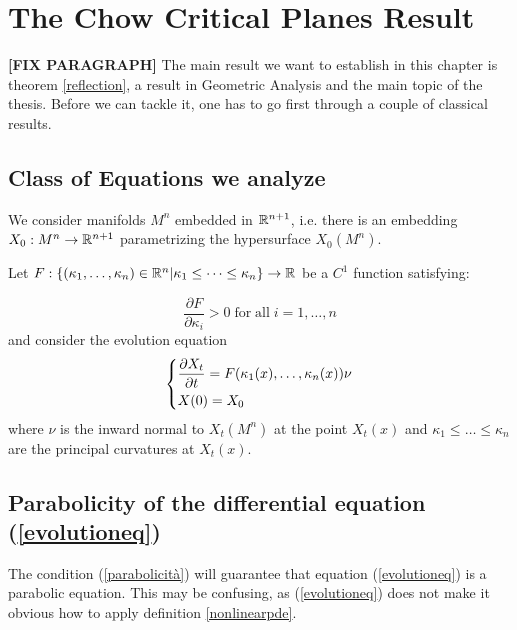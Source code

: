 \chapter{The Chow Critical Planes Result}

{\vspace{10pt}\LARGE \bf [FIX PARAGRAPH]}
The main result we want to establish in this chapter is theorem \ref{reflection}, a result in Geometric Analysis and the main topic of the thesis. Before we can tackle it, one has to go first through a couple of classical results. 


\section{Class of Equations we analyze}

We consider manifolds $M^n$ embedded in $\mathbb{R}^{n+1}$, i.e. there is an embedding $X_0 : M^n \rightarrow \mathbb{R}^{n+1}$ parametrizing the hypersurface $X_0(M^n)$. 

Let $F:\{(\kappa_1, \dots , \kappa_n)\in \mathbb{R}^n\vert \kappa_1\leq \dots \leq \kappa_n\}\rightarrow \mathbb{R}$ be a $C^1$ function satisfying:

\begin{equation}
	\frac{\partial F}{\partial \kappa_i} > 0 \mathrm{\; for \; all } \; i=1,\dots, n \label{parabolicità}
\end{equation}
and consider the evolution equation 
\begin{align}
	\begin{dcases}
		\frac{\partial X_t}{\partial t} = F(\kappa_1(x), \dots , \kappa_n(x)) \nu\\
		X(0)= X_0
	\end{dcases} \label{evolutioneq}
\end{align}
where $\nu$ is the inward normal to $X_t(M^n)$ at the point $X_t(x)$ and $\kappa_1\leq \dots \leq \kappa_n$ are the principal curvatures at $X_t(x)$. 


\section{Parabolicity of the differential equation (\ref{evolutioneq})}\label{parabolic}


The condition (\ref{parabolicità}) will  guarantee that equation (\ref{evolutioneq}) is a parabolic equation. This may be confusing, as (\ref{evolutioneq}) does not make it obvious how to apply definition \ref{nonlinearpde}. 

